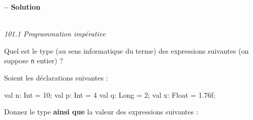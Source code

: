 \documentclass[10pt, a4paper, answers]{\path exam}
\begin{document}
{
	\begin{center}

		\ifprintanswers{}
		\huge{\textbf{\shorttitle -- Solution}}\\
		\else
		\huge{\textbf{\thetitle}}\\
		\fi
		
		\large \textit {101.1 Programmation impérative}\\
	\end{center}
}

\begin{questions}

\question
Quel est le type (au sens informatique du terme) des expressions suivantes (on suppose \texttt{n} entier) ? 


\question

Soient les déclarations suivantes :
\begin{scala}
val n: Int = 10; val p: Int = 4
val q: Long = 2; val x: Float = 1.76f;
\end{scala}

Donnez le type \textbf{ainsi que} la valeur des expressions suivantes :
\begin{parts}

\end{parts}
\end{questions}
\end{document}
